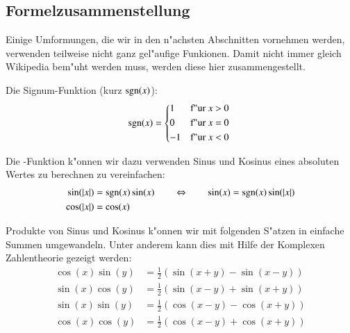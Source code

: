 \subsection{Formelzusammenstellung}
Einige Umformungen, die wir in den n"achsten Abschnitten vornehmen werden, 
verwenden teilweise nicht ganz gel"aufige Funkionen. Damit nicht immer gleich 
Wikipedia bem"uht werden muss, werden diese hier zusammengestellt.

Die Signum-Funktion (kurz $\sgn(x)$):
\begin{equation}
\sgn(x) =
\begin{cases*}
1 & f"ur $x$ > 0 \\
0 & f"ur $x$ = 0 \\
-1 & f"ur $x$ < 0
\end{cases*}
\label{equation:lorenz2:signum}
\end{equation}

Die \sgn-Funktion k"onnen wir dazu verwenden Sinus und Kosinus eines absoluten 
Wertes zu berechnen zu vereinfachen:
\begin{equation}
\begin{split}
\sin(|x|) &= \sgn(x)\sin(x) \qquad \Leftrightarrow \qquad \sin(x) = 
\sgn(x)\sin(|x|)
\\
\cos(|x|) &= \cos(x)
\end{split}
\label{equation:lorenz2:sincosabs}
\end{equation}

Produkte von Sinus und Kosinus k"onnen wir mit folgenden S"atzen in einfache 
Summen umgewandeln. Unter anderem kann dies mit Hilfe der Komplexen 
Zahlentheorie gezeigt werden:
\begin{align*}
\cos(x)\sin(y) &= \frac{1}{2} \left(\sin(x + y) - \sin(x - y)\right)
\\
\sin(x)\cos(y) &= \frac{1}{2} \left(\sin(x - y) + \sin(x + y)\right)
\\
\sin(x)\sin(y) &= \frac{1}{2} \left(\cos(x - y) - \cos(x + y)\right)
\\
\cos(x)\cos(y) &= \frac{1}{2} \left(\cos(x - y) + \cos(x + y)\right)
\end{align*}
